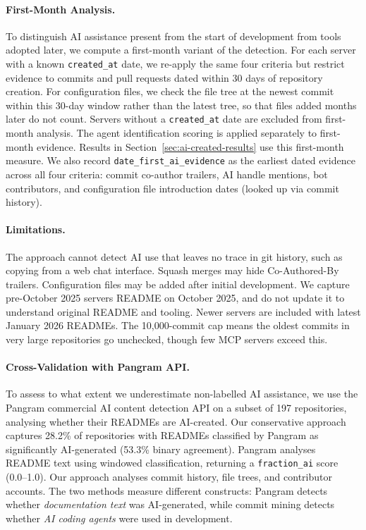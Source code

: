 \documentclass[manuscript,screen,nonacm,oneside]{acmart}
\begin{document}
\paragraph{First-Month Analysis.}
To distinguish AI assistance present from the start of development from tools adopted later, we compute a first-month variant of the detection. For each server with a known \texttt{created\_at} date, we re-apply the same four criteria but restrict evidence to commits and pull requests dated within 30 days of repository creation. For configuration files, we check the file tree at the newest commit within this 30-day window rather than the latest tree, so that files added months later do not count. Servers without a \texttt{created\_at} date are excluded from first-month analysis. The agent identification scoring is applied separately to first-month evidence. Results in Section~\ref{sec:ai-created-results} use this first-month measure. We also record \texttt{date\_first\_ai\_evidence} as the earliest dated evidence across all four criteria: commit co-author trailers, AI handle mentions, bot contributors, and configuration file introduction dates (looked up via commit history).

\paragraph{Limitations.}
The approach cannot detect AI use that leaves no trace in git history, such as copying from a web chat interface. Squash merges may hide Co-Authored-By trailers. Configuration files may be added after initial development. We capture pre-October 2025 servers README on October 2025, and do not update it to understand original README and tooling. Newer servers are included with latest January 2026 READMEs. The 10,000-commit cap means the oldest commits in very large repositories go unchecked, though few MCP servers exceed this.

\paragraph{Cross-Validation with Pangram API.}
To assess to what extent we underestimate non-labelled AI assistance, we use the Pangram commercial AI content detection API on a subset of 197 repositories, analysing whether their READMEs are AI-created. Our conservative approach captures 28.2\% of repositories with READMEs classified by Pangram as significantly AI-generated (53.3\% binary agreement). Pangram analyses README text using
windowed classification, returning a \texttt{fraction\_ai} score (0.0--1.0). Our approach
analyses commit history, file trees, and contributor accounts. The two methods measure
different constructs: Pangram detects whether \emph{documentation text} was AI-generated,
while commit mining detects whether \emph{AI coding agents} were used in development.
\end{document}
